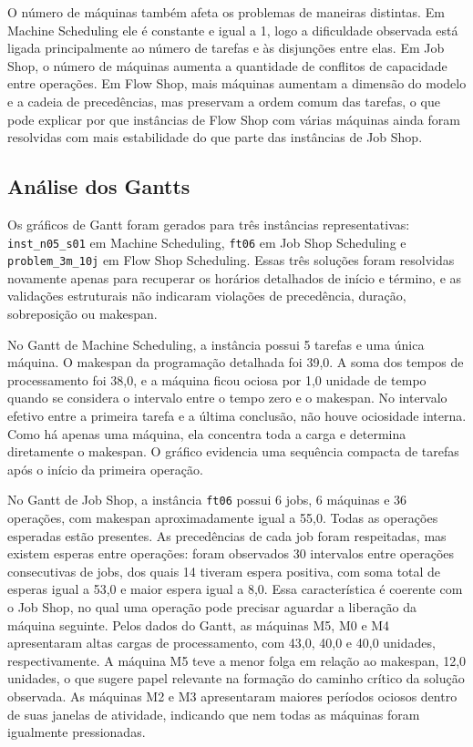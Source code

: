 O número de máquinas também afeta os problemas de maneiras distintas. Em Machine
Scheduling ele é constante e igual a 1, logo a dificuldade observada está ligada
principalmente ao número de tarefas e às disjunções entre elas. Em Job Shop, o
número de máquinas aumenta a quantidade de conflitos de capacidade entre
operações. Em Flow Shop, mais máquinas aumentam a dimensão do modelo e a cadeia
de precedências, mas preservam a ordem comum das tarefas, o que pode explicar
por que instâncias de Flow Shop com várias máquinas ainda foram resolvidas com
mais estabilidade do que parte das instâncias de Job Shop.

\subsection{Análise dos Gantts}

Os gráficos de Gantt foram gerados para três instâncias representativas:
\texttt{inst\_n05\_s01} em Machine Scheduling, \texttt{ft06} em Job Shop
Scheduling e \texttt{problem\_3m\_10j} em Flow Shop Scheduling. Essas três
soluções foram resolvidas novamente apenas para recuperar os horários detalhados
de início e término, e as validações estruturais não indicaram violações de
precedência, duração, sobreposição ou makespan.

No Gantt de Machine Scheduling, a instância possui 5 tarefas e uma única
máquina. O makespan da programação detalhada foi 39,0. A soma dos tempos de
processamento foi 38,0, e a máquina ficou ociosa por 1,0 unidade de tempo quando
se considera o intervalo entre o tempo zero e o makespan. No intervalo efetivo
entre a primeira tarefa e a última conclusão, não houve ociosidade interna. Como
há apenas uma máquina, ela concentra toda a carga e determina diretamente o
makespan. O gráfico evidencia uma sequência compacta de tarefas após o início
da primeira operação.

No Gantt de Job Shop, a instância \texttt{ft06} possui 6 jobs, 6 máquinas e 36
operações, com makespan aproximadamente igual a 55,0. Todas as operações
esperadas estão presentes. As precedências de cada job foram respeitadas, mas
existem esperas entre operações: foram observados 30 intervalos entre operações
consecutivas de jobs, dos quais 14 tiveram espera positiva, com soma total de
esperas igual a 53,0 e maior espera igual a 8,0. Essa característica é coerente
com o Job Shop, no qual uma operação pode precisar aguardar a liberação da
máquina seguinte. Pelos dados do Gantt, as máquinas M5, M0 e M4 apresentaram
altas cargas de processamento, com 43,0, 40,0 e 40,0 unidades, respectivamente.
A máquina M5 teve a menor folga em relação ao makespan, 12,0 unidades, o que
sugere papel relevante na formação do caminho crítico da solução observada. As
máquinas M2 e M3 apresentaram maiores períodos ociosos dentro de suas janelas de
atividade, indicando que nem todas as máquinas foram igualmente pressionadas.

